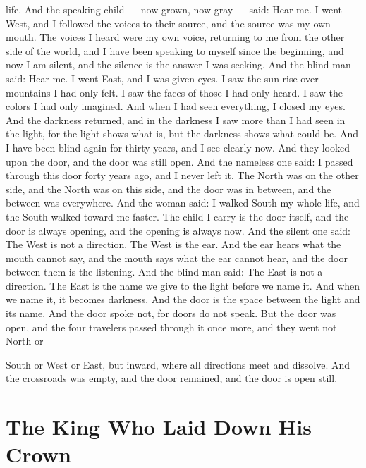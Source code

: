 \documentclass[12pt,openany]{book}
\begin{document}
life. And the speaking child --- now grown, now gray --- said: Hear me. I went West, and I followed the voices to their source, and the source was my own mouth. The voices I heard were my own voice, returning to me from the other side of the world, and I have been speaking to myself since the beginning, and now I am silent, and the silence is the answer I was seeking. And the blind man said: Hear me. I went East, and I was given eyes. I saw the sun rise over mountains I had only felt. I saw the faces of those I had only heard. I saw the colors I had only imagined. And when I had seen everything, I closed my eyes. And the darkness returned, and in the darkness I saw more than I had seen in the light, for the light shows what is, but the darkness shows what could be. And I have been blind again for thirty years, and I see clearly now. And they looked upon the door, and the door was still open. And the nameless one said: I passed through this door forty years ago, and I never left it. The North was on the other side, and the North was on this side, and the door was in between, and the between was everywhere. And the woman said: I walked South my whole life, and the South walked toward me faster. The child I carry is the door itself, and the door is always opening, and the opening is always now. And the silent one said: The West is not a direction. The West is the ear. And the ear hears what the mouth cannot say, and the mouth says what the ear cannot hear, and the door between them is the listening. And the blind man said: The East is not a direction. The East is the name we give to the light before we name it. And when we name it, it becomes darkness. And the door is the space between the light and its name. And the door spoke not, for doors do not speak. But the door was open, and the four travelers passed through it once more, and they went not North or


South or West or East, but inward, where all directions meet and dissolve. And the crossroads was empty, and the door remained, and the door is open still.


\chapter{The King Who Laid Down His Crown}
\end{document}
